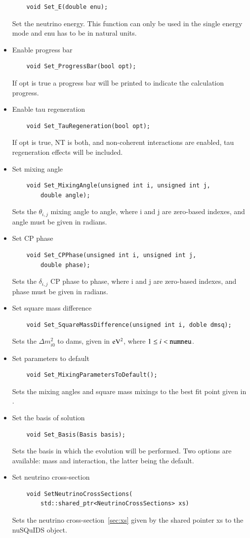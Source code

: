 \documentclass[3p,12pt]{elsarticle}
\newcommand{\ttf}{\ttfamily}
\begin{document}
\begin{itemize}
\begin{lstlisting}
    void Set_E(double enu);
  \end{lstlisting}
  Set the neutrino energy. This function can only be used in the
  single energy mode and {\ttf enu} has to be in natural units.
  \item Enable progress bar
  \begin{lstlisting}
    void Set_ProgressBar(bool opt);
  \end{lstlisting}
  If {\ttf opt} is {\ttf true} a progress bar will be printed to
  indicate the calculation progress. 
  \item Enable tau regeneration
  \begin{lstlisting}
    void Set_TauRegeneration(bool opt);
  \end{lstlisting}
  If {\ttf opt} is {\ttf true}, {\ttf NT} is {\ttf both}, and non-coherent 
    interactions are enabled, tau regeneration effects will be included.
  \item Set mixing angle
  \begin{lstlisting}
    void Set_MixingAngle(unsigned int i, unsigned int j,
        double angle);
  \end{lstlisting}
  Sets the $\theta_{i,j}$ mixing angle to {\ttf angle}, where {\ttf i}
  and {\ttf j} are zero-based indexes, and {\ttf angle} must be given in radians.
  \item Set CP phase
  \begin{lstlisting}
    void Set_CPPhase(unsigned int i, unsigned int j,
        double phase);
  \end{lstlisting}
  Sets the $\delta_{i,j}$ CP phase to {\ttf phase}, where {\ttf i} and
  {\ttf j} are zero-based indexes, and {\ttf phase} must be given in radians.
  \item Set square mass difference
  \begin{lstlisting}
    void Set_SquareMassDifference(unsigned int i, doble dmsq);
  \end{lstlisting}
  Sets the $\Delta m^2_{i0}$ to {\ttf dams}, given in ${\rm eV}^2$,
  where $1\le i < {\rm \tt numneu}$. 
  \item Set parameters to default
  \begin{lstlisting}
    void Set_MixingParametersToDefault();
  \end{lstlisting}
  Sets the mixing angles and square mass mixings to the best fit point
  given in \citep{Gonzalez-Garcia:2014bfa}. 
  \item Set the basis of solution
  \begin{lstlisting}
    void Set_Basis(Basis basis);
  \end{lstlisting}
  Sets the basis in which the evolution will be performed. Two options
  are available: {\ttf mass} and {\ttf interaction}, the latter being
  the default. 
\item Set neutrino cross-section
  \begin{lstlisting}
    void SetNeutrinoCrossSections(
        std::shared_ptr<NeutrinoCrossSections> xs)
  \end{lstlisting}
  Sets the neutrino cross-section~\ref{sec:xs} given by the shared
  pointer {\ttf xs} to the nuSQuIDS object.
\end{itemize}
  
\end{document}
